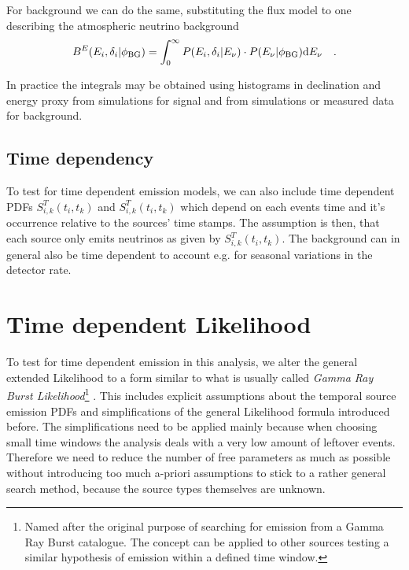 For background we can do the same, substituting the flux model to one describing the atmospheric neutrino background
\begin{equation}
  B^E(E_i, \delta_i|\phi_\mathrm{BG}) =
    \int_0^\infty P(E_i,\delta_i|E_\nu)\cdot P(E_\nu|\phi_\mathrm{BG}) \mathrm{d}E_\nu
    \quad\text{.}
\end{equation}

In practice the integrals may be obtained using histograms in declination and energy proxy from simulations for signal and from simulations or measured data for background.

\subsection{Time dependency}
To test for time dependent emission models, we can also include time dependent PDFs $S_{i,k}^T(t_i, t_k)$ and $S_{i,k}^T(t_i, t_k)$ which depend on each events time and it's occurrence relative to the sources' time stamps.
The assumption is then, that each source only emits neutrinos as given by $S_{i,k}^T(t_i, t_k)$.
The background can in general also be time dependent to account e.g. for seasonal variations in the detector rate.


\section{Time dependent Likelihood}
To test for time dependent emission in this analysis, we alter the general extended Likelihood to a form similar to what is usually called \emph{Gamma Ray Burst Likelihood}\footnote{Named after the original purpose of searching for emission from a Gamma Ray Burst catalogue. The concept can be applied to other sources testing a similar hypothesis of emission within a defined time window.} .
This includes explicit assumptions about the temporal source emission PDFs and simplifications of the general Likelihood formula introduced before.
The simplifications need to be applied mainly because when choosing small time windows the analysis deals with a very low amount of leftover events.
Therefore we need to reduce the number of free parameters as much as possible without introducing too much a-priori assumptions to stick to a rather general search method, because the source types themselves are unknown.

